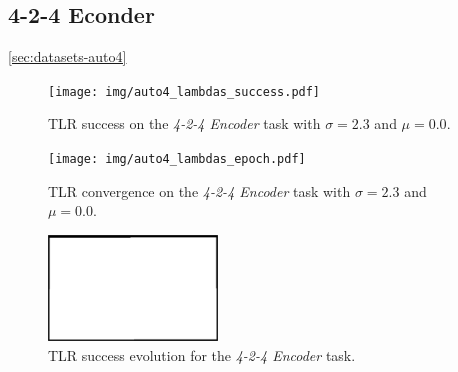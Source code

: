 
\subsection{4-2-4 Econder} 
\label{sec:tlr-auto4} 

\ref{sec:datasets-auto4} 
\begin{figure}[H]
  \centering
  \texttt{[image: img/auto4\_lambdas\_success.pdf]}   
  \caption{TLR success on the \emph{4-2-4 Encoder} task with $\sigma = 2.3$ and $\mu = 0.0$.}
  \label{fig:results-two-lambdas-auto4-success}
\end{figure}
\begin{figure}[H]
  \centering
  \texttt{[image: img/auto4\_lambdas\_epoch.pdf]}     
  \caption{TLR convergence on the \emph{4-2-4 Encoder} task with $\sigma = 2.3$ and $\mu = 0.0$.}
  \label{fig:results-two-lambdas-auto4-epoch}
\end{figure}

\begin{figure}[H]
  \centering
  \includegraphics[width=0.4\textwidth]{img/placeholder.png}    
  \caption{TLR success evolution for the \emph{4-2-4 Encoder} task.}
  \label{fig:results-two-lambdas-auto4-epoch} 
\end{figure}
